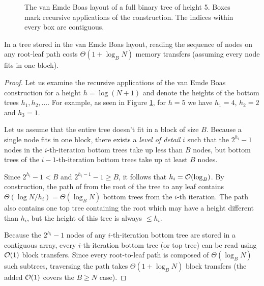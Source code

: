 \begin{figure}

\caption{The van Emde Boas layout of a full binary tree of height 5.
Boxes mark recursive applications of the construction. The indices within
every box are contiguous.}
\label{fig:veb_layout_5}
\end{figure}

\begin{theorem}
In a tree stored in the van Emde Boas layout, reading the sequence of nodes
on any root-leaf path costs $\Theta(1+\log_B N)$ memory transfers (assuming
every node fits in one block).
\end{theorem}

\begin{proof}
Let us examine the recursive applications of the van Emde Boas construction
for a height $h=\log (N+1)$ and denote the heights of the bottom trees
$h_1, h_2, \ldots$. For example, as seen in Figure \ref{fig:veb_layout_5}, for
$h=5$ we have $h_1=4$, $h_2=2$ and $h_3=1$.

Let us assume that the entire tree doesn't fit in a block of size $B$.
Because a single node fits in one block, there exists a \textit{level of
detail} $i$ such that the $2^{h_i}-1$ nodes in the $i$-th-iteration bottom trees
take up less than $B$ nodes, but bottom trees of the $i-1$-th-iteration bottom
trees take up at least $B$ nodes.

Since $2^{h_i}-1 < B$ and $2^{h_i-1}-1 \geq B$, it follows that $h_i=\mathcal{O}(\log_B)$.
By construction, the path of from the root of the tree to any leaf contains
$\Theta(\log N/h_i)=\Theta(\log_B N)$ bottom trees from the $i$-th iteration.
The path also contains one top tree containing the root which may have a height
different than $h_i$, but the height of this tree is always $\leq h_i$.

Because the $2^{h_i}-1$ nodes of any $i$-th-iteration bottom tree are stored
in a contiguous array, every $i$-th-iteration bottom tree (or top tree)
can be read using $\mathcal{O}(1)$ block transfers. Since every root-to-leaf path
is composed of $\Theta(\log_B N)$ such subtrees, traversing the path
takes $\Theta(1+\log_B N)$ block transfers (the added $\mathcal{O}(1)$ covers
the $B\geq N$ case).
\end{proof}

